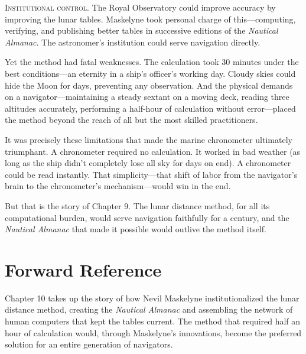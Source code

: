 \textsc{Institutional control.} The Royal Observatory could improve accuracy by improving the lunar tables. Maskelyne took personal charge of this—computing, verifying, and publishing better tables in successive editions of the \textit{Nautical Almanac}. The astronomer's institution could serve navigation directly.

Yet the method had fatal weaknesses. The calculation took 30 minutes under the best conditions—an eternity in a ship's officer's working day. Cloudy skies could hide the Moon for days, preventing any observation. And the physical demands on a navigator—maintaining a steady sextant on a moving deck, reading three altitudes accurately, performing a half-hour of calculation without error—placed the method beyond the reach of all but the most skilled practitioners.

It was precisely these limitations that made the marine chronometer ultimately triumphant. A chronometer required no calculation. It worked in bad weather (as long as the ship didn't completely lose all sky for days on end). A chronometer could be read instantly. That simplicity—that shift of labor from the navigator's brain to the chronometer's mechanism—would win in the end.

But that is the story of Chapter 9. The lunar distance method, for all its computational burden, would serve navigation faithfully for a century, and the \textit{Nautical Almanac} that made it possible would outlive the method itself.

\section*{Forward Reference}

Chapter 10 takes up the story of how Nevil Maskelyne institutionalized the lunar distance method, creating the \textit{Nautical Almanac} and assembling the network of human computers that kept the tables current. The method that required half an hour of calculation would, through Maskelyne's innovations, become the preferred solution for an entire generation of navigators.

\label{sec:08-end}
